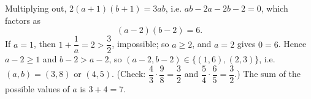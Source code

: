 Multiplying out, $2(a+1)(b+1)=3ab$, i.e. $ab-2a-2b-2=0$, which factors as
\[(a-2)(b-2)=6 .\]
If $a=1$, then $1+\dfrac{1}{a}=2>\dfrac{3}{2}$, impossible; so $a\ge2$, and $a=2$ gives $0=6$. Hence $a-2\ge1$ and $b-2>a-2$, so $(a-2,b-2)\in\{(1,6),(2,3)\}$, i.e. $(a,b)=(3,8)$ or $(4,5)$. (Check: $\dfrac{4}{3}\cdot\dfrac{9}{8}=\dfrac{3}{2}$ and $\dfrac{5}{4}\cdot\dfrac{6}{5}=\dfrac{3}{2}$.) The sum of the possible values of $a$ is $3+4=\boxed{7}$.
